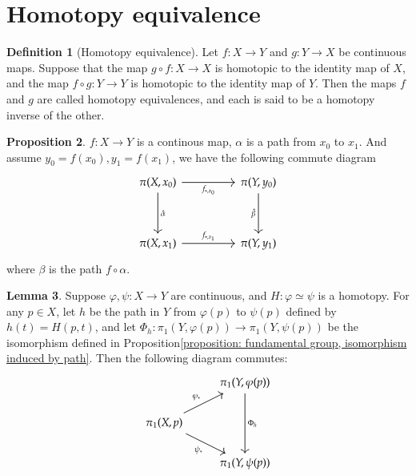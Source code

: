 \documentclass[12pt,a4paper]{book}
\theoremstyle{definition}
\newtheorem{defn}{Definition}[section]
\newtheorem{lem}[defn]{Lemma}
\newtheorem{prop}[defn]{Proposition}
\begin{document}
\section{Homotopy equivalence}
\begin{defn}[Homotopy equivalence]
    Let $f: X \rightarrow Y$ and $g: Y \rightarrow X$ be continuous maps. Suppose that the map $g \circ f: X \rightarrow X$ is homotopic to the identity map of $X$, and the map $f \circ g: Y \rightarrow Y$ is homotopic to the identity map of $Y$. Then the maps $f$ and $g$ are called homotopy equivalences, and each is said to be a homotopy inverse of the other.
\end{defn}
\begin{prop}
    $f:X\rightarrow Y $ is a continous map, $\alpha$ is a path from $x_0$ to $x_1$.
    And assume $y_0=f(x_0),y_1=f(x_1)$, we have the following commute diagram
    \[\begin{tikzcd}
            {\pi(X,x_0)} && {\pi(Y,y_0)} \\
            \\
            {\pi(X,x_1)} && {\pi(Y,y_1)}
            \arrow["{f_{*,x_0}}"', from=1-1, to=1-3]
            \arrow["{\hat{\alpha}}", from=1-1, to=3-1]
            \arrow["{\hat{\beta}}"', from=1-3, to=3-3]
            \arrow["{f_{*,x_1}}", from=3-1, to=3-3]
        \end{tikzcd}\]
    where $\beta$ is the path $f\circ \alpha$.
    \label{proposition:commute diagram, fundemental group}
\end{prop}
\begin{lem}
    Suppose $\varphi, \psi: X \rightarrow Y$ are continuous, 
    and $H: \varphi \simeq \psi$ is a homotopy. 
    For any $p \in X$, let $h$ be the path in $Y$ from $\varphi(p)$ to $\psi(p)$ 
    defined by $h(t)=H(p, t)$, and let $\Phi_h: \pi_1(Y, \varphi(p)) \rightarrow \pi_1(Y, \psi(p))$ 
    be the isomorphism defined in Proposition\ref{proposition: fundamental group, isomorphism induced by path}. 
    Then the following diagram commutes:%
\[\begin{tikzcd}
	& {\pi_1(Y,\varphi(p))} \\
	{\pi_1(X,p)} \\
	& {\pi_1(Y,\psi(p))}
	\arrow["{\Phi_h}", from=1-2, to=3-2]
	\arrow["{\varphi_*}", from=2-1, to=1-2]
	\arrow["{\psi_*}"', from=2-1, to=3-2]
\end{tikzcd}\]
\end{lem}
\end{document}
